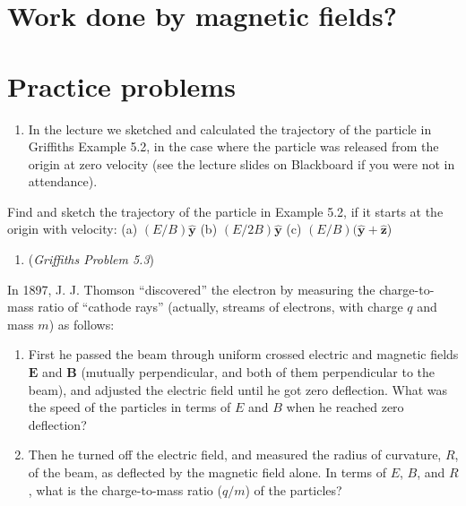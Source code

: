 \documentclass[
  letterpaper,
  DIV=11,
  numbers=noendperiod]{scrreprt}
\providecommand{\tightlist}{%
  \setlength{\itemsep}{0pt}\setlength{\parskip}{0pt}}\usepackage{longtable,booktabs,array}
\begin{document}
\section{Work done by magnetic
fields?}\label{work-done-by-magnetic-fields}

\section{Practice problems}\label{practice-problems-3}

\begin{enumerate}
\def\labelenumi{\arabic{enumi})}
\tightlist
\item
  In the lecture we sketched and calculated the trajectory of the
  particle in Griffiths Example 5.2, in the case where the particle was
  released from the origin at zero velocity (see the lecture slides on
  Blackboard if you were not in attendance).
\end{enumerate}

Find and sketch the trajectory of the particle in Example 5.2, if it
starts at the origin with velocity: (a)
\((E/B) \hat{\mathrm{\mathbf{y}}}\) (b)
\((E/2B) \hat{\mathrm{\mathbf{y}}}\) (c)
\((E/B) (\hat{\mathrm{\mathbf{y}}} + \hat{\mathrm{\mathbf{z}}}\))

\begin{enumerate}
\def\labelenumi{\arabic{enumi})}
\setcounter{enumi}{1}
\tightlist
\item
  (\emph{Griffiths Problem 5.3})
\end{enumerate}

In 1897, J. J. Thomson ``discovered'' the electron by measuring the
charge-to-mass ratio of ``cathode rays'' (actually, streams of
electrons, with charge \(q\) and mass \(m\)) as follows:

\begin{enumerate}
\def\labelenumi{(\alph{enumi})}
\item
  First he passed the beam through uniform crossed electric and magnetic
  fields \(\mathrm{\mathbf{E}}\) and \(\mathrm{\mathbf{B}}\) (mutually
  perpendicular, and both of them perpendicular to the beam), and
  adjusted the electric field until he got zero deflection. What was the
  speed of the particles in terms of \(E\) and \(B\) when he reached
  zero deflection?
\item
  Then he turned off the electric field, and measured the radius of
  curvature, \(R\), of the beam, as deflected by the magnetic field
  alone. In terms of \(E\), \(B\), and \(R\), what is the charge-to-mass
  ratio (\(q/m\)) of the particles?
\end{enumerate}
\end{document}
